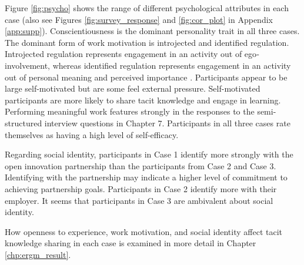 Figure \ref{fig:psycho} shows the range of different psychological attributes in each case (also see Figures \ref{fig:survey_response} and \ref{fig:cor_plot} in Appendix \ref{app:supp}). Conscientiousness is the dominant personality trait in all three cases. The dominant form of work motivation is introjected and identified regulation. Introjected regulation represents engagement in an activity out of ego‐involvement, whereas identified regulation represents engagement in an activity out of personal meaning and perceived importance \citep{gagne2019different}. Participants appear to be large self-motivated but are some feel external pressure. Self-motivated participants are more likely to share tacit knowledge and engage in learning. Performing meaningful work features strongly in the responses to the semi-structured interview questions in Chapter 7. Participants in all three cases rate themselves as having a high level of self-efficacy. \medskip

Regarding social identity, participants in Case 1 identify more strongly with the open innovation partnership than the participants from Case 2 and Case 3. Identifying with the partnership may indicate a higher level of commitment to achieving partnership goals. Participants in Case 2 identify more with their employer. It seems that participants in Case 3 are ambivalent about social identity. \medskip

How openness to experience, work motivation, and social identity affect tacit knowledge sharing in each case is examined in more detail in Chapter \ref{chp:ergm_result}.

